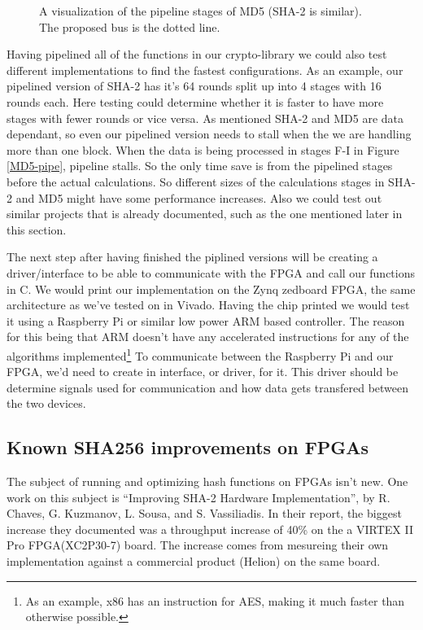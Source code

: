\documentclass[a4paper, openany]{book}
\begin{document}
\begin{abstact}
\begin{figure}[htbp]
\caption{\label{fig:MD5-pipe}A visualization of the pipeline stages of MD5 (SHA-2 is similar). The proposed bus is the dotted line.}
\end{figure}

Having pipelined all of the functions in our crypto-library we could also test different implementations to find the fastest configurations.
As an example, our pipelined version of SHA-2 has it's 64 rounds split up into 4 stages with 16 rounds each.
Here testing could determine whether it is faster to have more stages with fewer rounds or vice versa.
As mentioned SHA-2 and MD5 are data dependant, so even our pipelined version needs to stall when the we are handling more than one block.
When the data is being processed in stages F-I in Figure \ref{MD5-pipe}, pipeline stalls. So the only time save is from the pipelined stages before the actual calculations.
So different sizes of the calculations stages in SHA-2 and MD5 might have some performance increases.
Also we could test out similar projects that is already documented, such as the one mentioned later in this section.

The next step after having finished the piplined versions will be creating a driver/interface to be able to communicate with the FPGA and call our functions in C.
We would print our implementation on the Zynq zedboard FPGA, the same architecture as we've tested on in Vivado.
Having the chip printed we would test it using a Raspberry Pi or similar low power ARM based controller.
The reason for this being that ARM doesn't have any accelerated instructions for any of the algorithms implemented\footnote{As an example, x86 has an instruction for AES, making it much faster than otherwise possible.}
To communicate between the Raspberry Pi and our FPGA, we'd need to create in interface, or driver, for it.
This driver should be determine signals used for communication and how data gets transfered between the two devices.
\subsection{Known SHA256 improvements on FPGAs}
\label{sec:org44d6687}
The subject of running and optimizing hash functions on FPGAs isn't new. One work on this subject is ``Improving SHA-2 Hardware Implementation'', by R. Chaves, G. Kuzmanov, L. Sousa, and S. Vassiliadis.
In their report, the biggest increase they documented was a throughput increase of 40\% on the a VIRTEX II Pro FPGA(XC2P30-7) board.
The increase comes from mesureing their own implementation against a commercial product (Helion) on the same board.


\end{abstact}
\end{document}
